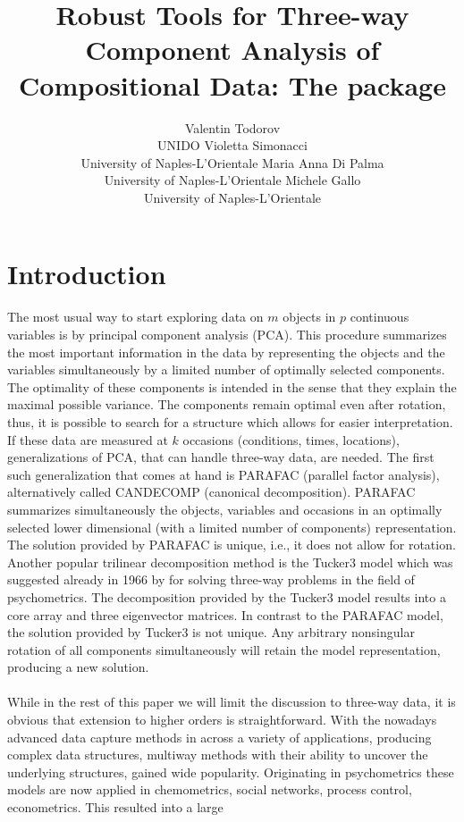 \documentclass[article,shortnames, nojss]{jss}
\author{Valentin Todorov\\UNIDO \And
        Violetta Simonacci\\University of Naples-L'Orientale \AND
        Maria Anna Di Palma\\University of Naples-L'Orientale \AND Michele Gallo\\University of Naples-L'Orientale}
\title{Robust Tools for Three-way Component Analysis of Compositional Data: The \proglang{R} package \pkg{rrcov3way}}
\begin{document}

\section[Introduction]{Introduction}
\label{sec:intro}
The most usual way to start exploring data on $m$ objects in $p$
continuous variables is by principal component analysis (PCA). This procedure
summarizes the most important information in the data by representing
the objects and the variables simultaneously by a limited number
of optimally selected components. The optimality
of these components is intended in the sense that they explain the
maximal possible variance. The components remain optimal
even after rotation, thus, it is possible to search for a structure
which allows for easier interpretation. If these data are
measured at $k$ occasions (conditions, times, locations),
generalizations of PCA, that can handle three-way data, are needed. The first such
generalization that comes at hand is PARAFAC (parallel
factor analysis), alternatively called CANDECOMP
(canonical decomposition)\citep{Harshman:1970, Carroll:1970}.
PARAFAC summarizes
simultaneously the objects, variables and occasions in an optimally
selected lower dimensional (with a limited number of components)
representation. The solution provided by PARAFAC is unique, i.e.,
it does not allow for rotation.
Another popular trilinear
decomposition method is the Tucker3 model which was suggested
already in 1966 by \citet{Tucker:1966} for solving three-way
problems in the field of psychometrics. The decomposition provided by
the Tucker3 model results into a core array and three eigenvector
matrices. In contrast to the PARAFAC model, the solution provided
by Tucker3 is not unique. Any arbitrary nonsingular rotation of
all components simultaneously will retain the model representation, producing a new solution.\\\\
While in the rest of this paper we will limit the discussion to
three-way data, it is obvious that extension to higher orders
is straightforward. With the nowadays advanced data capture methods
in across a variety of applications, producing complex data structures,
multiway methods with their ability to uncover the underlying
structures, gained wide popularity. Originating in psychometrics
these models are now applied in chemometrics, social networks,
process control, econometrics. This resulted into a large
\end{document}
